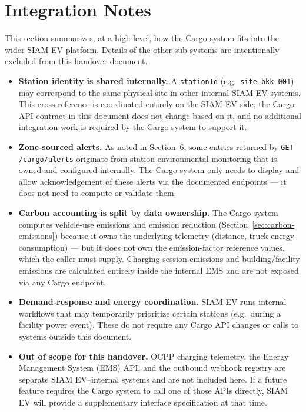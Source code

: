 \documentclass{article}
\begin{document}
\newpage

\section{Integration Notes}
\label{sec:integration-notes}

This section summarizes, at a high level, how the Cargo system fits into the
wider SIAM EV platform. Details of the other sub-systems are intentionally
excluded from this handover document.

\begin{itemize}[leftmargin=*]
    \item \textbf{Station identity is shared internally.} A \texttt{stationId}
          (e.g.\ \texttt{site-bkk-001}) may correspond to the same physical site
          in other internal SIAM EV systems. This cross-reference is coordinated
          entirely on the SIAM EV side; the Cargo API contract in this document
          does not change based on it, and no additional integration work is
          required by the Cargo system to support it.
    \item \textbf{Zone-sourced alerts.} As noted in Section~6, some entries returned
          by \texttt{GET /cargo/alerts} originate from station environmental
          monitoring that is owned and configured internally. The Cargo system
          only needs to display and allow acknowledgement of these alerts via the
          documented endpoints --- it does not need to compute or validate them.
    \item \textbf{Carbon accounting is split by data ownership.} The Cargo system
          computes vehicle-use emissions and emission reduction
          (Section~\ref{sec:carbon-emissions}) because it owns the underlying
          telemetry (distance, truck energy consumption) --- but it does not own the
          emission-factor reference values, which the caller must supply. Charging-session
          emissions and building/facility emissions are calculated entirely inside the
          internal EMS and are not exposed via any Cargo endpoint.
    \item \textbf{Demand-response and energy coordination.} SIAM EV runs internal
          workflows that may temporarily prioritize certain stations (e.g.\ during
          a facility power event). These do not require any Cargo API changes or
          calls to systems outside this document.
    \item \textbf{Out of scope for this handover.} OCPP charging telemetry, the
          Energy Management System (EMS) API, and the outbound webhook registry
          are separate SIAM EV--internal systems and are not included here. If a
          future feature requires the Cargo system to call one of those APIs
          directly, SIAM EV will provide a supplementary interface specification
          at that time.
\end{itemize}
\end{document}
